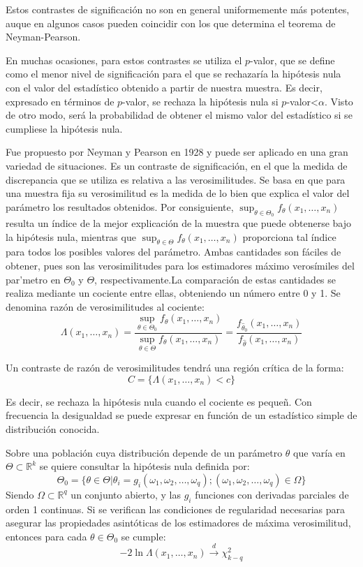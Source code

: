 Estos contrastes de significaci\'on no son en  general uniformemente m\'as potentes, auque en algunos casos pueden coincidir con los que determina el teorema de Neyman-Pearson.

En muchas ocasiones, para estos contrastes se utiliza el $p$-valor, que se define como el menor nivel de significaci\'on para el que se rechazar\'ia la hip\'otesis nula con el valor del estad\'istico obtenido a partir de nuestra muestra. Es decir, expresado en t\'erminos de $p$-valor, se rechaza la hip\'otesis nula si $p$-valor<$\alpha$. Visto de otro modo, ser\'a la probabilidad de obtener el mismo valor del estad\'istico si se cumpliese la hip\'otesis nula.


Fue propuesto por Neyman y Pearson en 1928 y puede ser aplicado en una gran variedad de situaciones. Es un contraste de significaci\'on, en el que la medida de discrepancia que se utiliza es relativa a las verosimilitudes. Se basa en que para una muestra fija su verosimilitud es la medida de lo bien que explica el valor del par\'ametro los resultados obtenidos. Por consiguiente, $\sup_{\theta\in\Theta_0}f_{\theta}(x_1,\ldots,x_n)$ resulta un \'indice de la mejor explicaci\'on de la muestra que puede obtenerse bajo la hip\'otesis nula, mientras que $\sup_{\theta\in\Theta}f_{\theta}(x_1,\ldots,x_n)$ proporciona tal \'indice para todos los posibles valores del par\'ametro. Ambas cantidades son f\'aciles de obtener, pues son las verosimilitudes para los estimadores m\'aximo veros\'imiles del par\a'metro en $\Theta_0$ y $\Theta$, respectivamente.La comparaci\'on de estas cantidades se realiza mediante un cociente entre ellas, obteniendo un n\'umero entre 0 y 1. Se denomina raz\'on de verosimilitudes al cociente:
\[\Lambda(x_1,\ldots,x_n)=\dfrac{\sup_{\theta\in\Theta_0}f_{\theta}(x_1,\ldots,x_n)}{\sup_{\theta\in\Theta}f_{\theta}(x_1,\ldots,x_n)}=\dfrac{f_{\hat{\theta}_0}(x_1,\ldots,x_n)}{f_{\hat{\theta}}(x_1,\ldots,x_n)}\]

Un contraste de raz\'on de verosimilitudes tendr\'a una regi\'on cr\'itica de la forma:
\[C=\{\Lambda(x_1,\ldots,x_n)<c\}\]

Es decir, se rechaza la hip\'otesis nula cuando el cociente es peque\~n. Con frecuencia la desigualdad se puede expresar en funci\'on de un estad\'istico simple de distribuci\'on conocida.

\begin{teorema}
Sobre una poblaci\'on cuya distribuci\'on depende de un par\'ametro $\theta$ que var\'ia en $\Theta\subset\mathbb{R}^k$ se quiere consultar la hip\'otesis nula definida por:
\[\Theta_0=\{\theta\in\Theta|\theta_i=g_i(\omega_1,\omega_2,\ldots,\omega_q);(\omega_1,\omega_2,\ldots,\omega_q)\in\Omega\}\]
Siendo $\Omega\subset\mathbb{R}^q$ un conjunto abierto, y las $g_i$ funciones con derivadas parciales de orden 1 continuas. Si se verifican las condiciones de regularidad necesarias para asegurar las propiedades asint\'oticas de los estimadores de m\'axima verosimilitud, entonces para cada $\theta\in\Theta_0$ se cumple:
\[-2\ln{\Lambda(x_1,\ldots,x_n)}\overset{d}{\to}\chi^2_{k-q}\]
\end{teorema}


